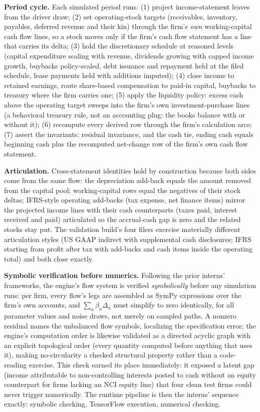 \documentclass[11pt]{article}
\newcommand{\lead}[2]{\par\addvspace{5pt}\textbf{\textcolor{#1}{#2}}}
\begin{document}
\lead{navytwo}{Period cycle.} Each simulated period runs: (1) project income-statement leaves from the driver draw; (2) set operating-stock targets (receivables, inventory, payables, deferred revenue and their kin) through the firm's \emph{own} working-capital cash flow lines, so a stock moves only if the firm's cash flow statement has a line that carries its delta; (3) hold the discretionary schedule at reasoned levels (capital expenditure scaling with revenue, dividends growing with capped income growth, buybacks policy-scaled, debt issuance and repayment held at the filed schedule, lease payments held with additions imputed); (4) close income to retained earnings, route share-based compensation to paid-in capital, buybacks to treasury where the firm carries one; (5) apply the liquidity policy: excess cash above the operating target sweeps into the firm's own investment-purchase lines (a behavioral treasury rule, not an accounting plug: the books balance with or without it); (6) recompute every derived row through the firm's calculation arcs; (7) assert the invariants: residual invariance, and the cash tie, ending cash equals beginning cash plus the recomputed net-change row of the firm's own cash flow statement.

\lead{navytwo}{Articulation.} Cross-statement identities hold by construction because both sides come from the same flow: the depreciation add-back equals the amount removed from the capital pool; working-capital rows equal the negatives of their stock deltas; IFRS-style operating add-backs (tax expense, net finance items) mirror the projected income lines with their cash counterparts (taxes paid, interest received and paid) articulated so the accrual-cash gap is zero and the related stocks stay put. The validation build's four filers exercise materially different articulation styles (US GAAP indirect with supplemental cash disclosures; IFRS starting from profit after tax with add-backs and cash items inside the operating total) and both close exactly.

\lead{navytwo}{Symbolic verification before numerics.} Following the prior interns' frameworks, the engine's flow system is verified \emph{symbolically} before any simulation runs: per firm, every flow's legs are assembled as SymPy expressions over the firm's own accounts, and $\sum_a \beta_a \Delta_a$ must simplify to zero identically, for all parameter values and noise draws, not merely on sampled paths. A nonzero residual names the unbalanced flow symbols, localizing the specification error; the engine's computation order is likewise validated as a directed acyclic graph with an explicit topological order (every quantity computed before anything that uses it), making no-circularity a checked structural property rather than a code-reading exercise. This check earned its place immediately: it exposed a latent gap (income attributable to non-controlling interests posted to cash without an equity counterpart for firms lacking an NCI equity line) that four clean test firms could never trigger numerically. The runtime pipeline is then the interns' sequence exactly: symbolic checking, TensorFlow execution, numerical checking.
\end{document}
